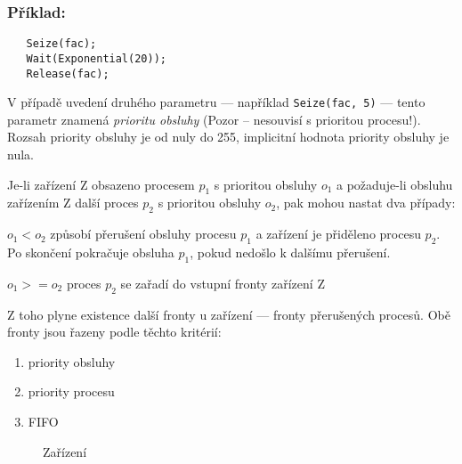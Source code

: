 \documentclass[a4paper]{article}
\begin{document}
\subsubsection*{Příklad:}  %

\begin{verbatim}
   Seize(fac);
   Wait(Exponential(20));
   Release(fac);
\end{verbatim}

V případě uvedení druhého parametru --- například \verb|Seize(fac, 5)| ---
tento parametr znamená {\em prioritu obsluhy} (Pozor -- nesouvisí s prioritou
procesu!).  Rozsah priority obsluhy je od nuly do 255, implicitní hodnota
priority obsluhy je nula.

Je-li zařízení Z obsazeno procesem $p_1$ s prioritou obsluhy $o_1$
a požaduje-li obsluhu zařízením Z další proces $p_2$ s prioritou
obsluhy $o_2$, pak mohou nastat dva případy:

\begin{description}

\item{$o_1 < o_2$}
         způsobí přerušení obsluhy procesu $p_1$ a zařízení je
         přiděleno procesu $p_2$. Po skončení pokračuje obsluha
         $p_1$, pokud nedošlo k dalšímu přerušení.

\item{$o_1 >= o_2$}
         proces $p_2$ se zařadí do vstupní fronty zařízení Z

\end{description}

Z toho plyne existence další fronty u zařízení --- fronty
přerušených procesů. Obě fronty jsou řazeny podle těchto
kritérií:

\begin{enumerate}
\item  priority obsluhy
\item  priority procesu
\item  FIFO
\end{enumerate}

%

\begin{figure}[ht]
  \begin{center}
    \caption{Zařízení}
    \label{o2}
  \end{center}
\end{figure}
\end{document}
